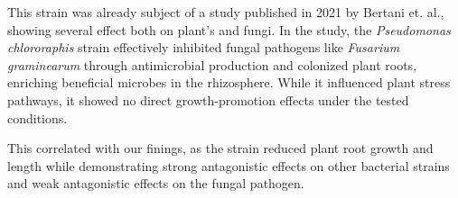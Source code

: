 This strain was already subject of a study published in 2021 by Bertani et. al., showing several effect both on plant's and fungi. 
In the study, the \textit{Pseudomonas chlororaphis} strain effectively inhibited fungal pathogens like \textit{Fusarium graminearum} through antimicrobial production and colonized plant roots, enriching beneficial microbes in the rhizosphere. While it influenced plant stress pathways, it showed no direct growth-promotion effects under the tested conditions. \cite{bertani2021Isolation}

This correlated with our finings, as the strain reduced plant root growth and length while demonstrating  strong antagonistic effects on other bacterial strains and weak antagonistic effects on the fungal pathogen.